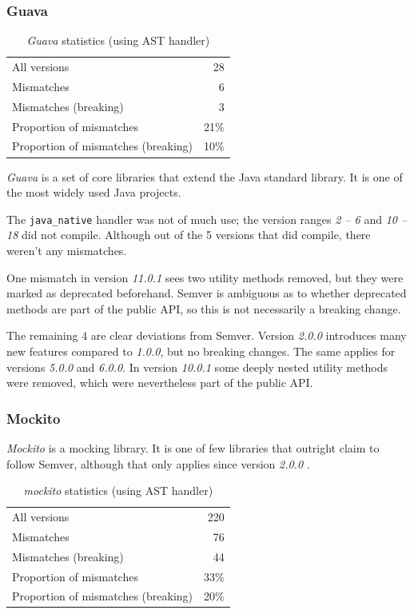 \documentclass{l4proj}
\newcommand\genericstyle{\lstset{basicstyle=\ttm}}
\newcommand\codeinline[1]{{\genericstyle\lstinline!#1!}}
\begin{document}
\subsubsection{Guava}

\begin{table}
\centering
\caption{\textit{Guava} statistics (using AST handler)}
\label{GuavaStatistics}
\begin{tabular}{|lr|}
All versions & 28 \\
Mismatches & 6 \\
Mismatches (breaking) & 3 \\
Proportion of mismatches & 21\% \\
Proportion of mismatches (breaking) & 10\% \\
\end{tabular}
\end{table}

\textit{Guava} \cite{Guava} is a set of core libraries that extend the
Java standard library. It is one of the most widely used Java
projects.

The \codeinline{java_native} handler was not of much use; the version
ranges \textit{2 -- 6} and \textit{10 -- 18} did not compile. Although
out of the 5 versions that did compile, there weren't any mismatches.

One mismatch in version \textit{11.0.1} sees two utility methods
removed, but they were marked as deprecated beforehand. Semver is
ambiguous as to whether deprecated methods are part of the public API,
so this is not necessarily a breaking change.

The remaining 4 are clear deviations from Semver. Version
\textit{2.0.0} introduces many new features compared to
\textit{1.0.0}, but no breaking changes. The same applies for versions
\textit{5.0.0} and \textit{6.0.0}. In version \textit{10.0.1} some
deeply nested utility methods were removed, which were nevertheless
part of the public API.

\subsubsection{Mockito}

\textit{Mockito} \cite{Mockito} is a mocking library. It is one of few
libraries that outright claim to follow Semver, although that only
applies since version \textit{2.0.0} \cite{MockitoSemver}.

\begin{table}
\centering
\caption{\textit{mockito} statistics (using AST handler)}
\label{MockitoStatistics}
\begin{tabular}{|lr|}
All versions & 220 \\
Mismatches & 76 \\
Mismatches (breaking) & 44 \\
Proportion of mismatches & 33\% \\
Proportion of mismatches (breaking) & 20\% \\
\end{tabular}
\end{table}
\end{document}
